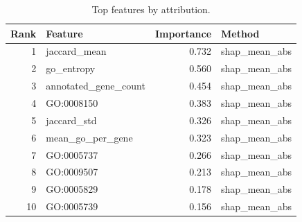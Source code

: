 \begin{table}[htbp]
\centering
\caption{Top features by attribution.}
\label{tab:top_features_recomputed}
\begin{tabular}{rlrl}
\toprule
Rank & Feature & Importance & Method \\
\midrule
1 & jaccard\_mean & 0.732 & shap\_mean\_abs \\
2 & go\_entropy & 0.560 & shap\_mean\_abs \\
3 & annotated\_gene\_count & 0.454 & shap\_mean\_abs \\
4 & GO:0008150 & 0.383 & shap\_mean\_abs \\
5 & jaccard\_std & 0.326 & shap\_mean\_abs \\
6 & mean\_go\_per\_gene & 0.323 & shap\_mean\_abs \\
7 & GO:0005737 & 0.266 & shap\_mean\_abs \\
8 & GO:0009507 & 0.213 & shap\_mean\_abs \\
9 & GO:0005829 & 0.178 & shap\_mean\_abs \\
10 & GO:0005739 & 0.156 & shap\_mean\_abs \\
\bottomrule
\end{tabular}

\end{table}
